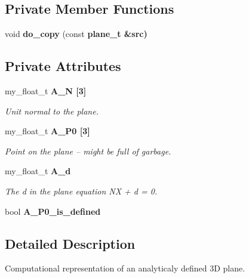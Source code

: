 \subsection*{Private Member Functions}
\begin{CompactItemize}
\item 
void \textbf{do\_\-copy} (const \bf{plane\_\-t} \&src)\label{classSimSite3D_1_1geometry_1_1plane__t_07d9042854d890d0f1f6d67b24005944}

\end{CompactItemize}
\subsection*{Private Attributes}
\begin{CompactItemize}
\item 
my\_\-float\_\-t \bf{A\_\-N} [3]\label{classSimSite3D_1_1geometry_1_1plane__t_729fc8d83f6730ffccbf6ebfddaf8f77}

\begin{CompactList}\small\item\em Unit normal to the plane. \item\end{CompactList}\item 
my\_\-float\_\-t \bf{A\_\-P0} [3]\label{classSimSite3D_1_1geometry_1_1plane__t_9b2e543bd396510e30f8c38b95c13b43}

\begin{CompactList}\small\item\em Point on the plane -- might be full of garbage. \item\end{CompactList}\item 
my\_\-float\_\-t \bf{A\_\-d}\label{classSimSite3D_1_1geometry_1_1plane__t_d8acc9a64d3c29dd0f25e9a681dcb343}

\begin{CompactList}\small\item\em The d in the plane equation NX + d = 0. \item\end{CompactList}\item 
bool \textbf{A\_\-P0\_\-is\_\-defined}\label{classSimSite3D_1_1geometry_1_1plane__t_0d32a9703fc45b724246c824c20b8af9}

\end{CompactItemize}


\subsection{Detailed Description}
Computational representation of an analyticaly defined 3D plane. 



